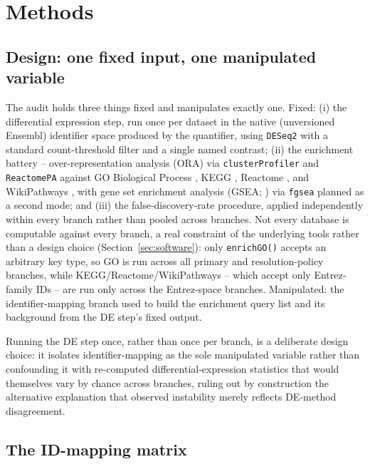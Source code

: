\documentclass[webpdf,contemporary,large]{oup-authoring-template}
\theoremstyle{thmstyleone}%
\theoremstyle{thmstyletwo}%
\theoremstyle{thmstylethree}%
\begin{document}
\section{Methods}\label{sec:methods}

\subsection{Design: one fixed input, one manipulated variable}\label{sec:design}

The audit holds three things fixed and manipulates exactly one. Fixed: (i) the differential expression step, run once per dataset in the native (unversioned Ensembl) identifier space produced by the quantifier, using \texttt{DESeq2} \citep{love2014deseq2} with a standard count-threshold filter and a single named contrast; (ii) the enrichment battery -- over-representation analysis (ORA) via \texttt{clusterProfiler} \citep{yu2012clusterprofiler} and \texttt{ReactomePA} \citep{yu2016reactomepa} against GO Biological Process \citep{ashburner2000go}, KEGG \citep{kanehisa2000kegg}, Reactome \citep{fabregat2018reactome}, and WikiPathways \citep{martens2021wikipathways}, with gene set enrichment analysis (GSEA; \citealp{subramanian2005gsea}) via \texttt{fgsea} \citep{korotkevich2021fgsea} planned as a second mode; and (iii) the false-discovery-rate procedure, applied independently within every branch rather than pooled across branches. Not every database is computable against every branch, a real constraint of the underlying tools rather than a design choice (Section~\ref{sec:software}): only \texttt{enrichGO()} accepts an arbitrary key type, so GO is run across all primary and resolution-policy branches, while KEGG/Reactome/WikiPathways -- which accept only Entrez-family IDs -- are run only across the Entrez-space branches. Manipulated: the identifier-mapping branch used to build the enrichment query list and its background from the DE step's fixed output.

Running the DE step once, rather than once per branch, is a deliberate design choice: it isolates identifier-mapping as the sole manipulated variable rather than confounding it with re-computed differential-expression statistics that would themselves vary by chance across branches, ruling out by construction the alternative explanation that observed instability merely reflects DE-method disagreement.

\subsection{The ID-mapping matrix}\label{sec:matrix}
\end{document}
